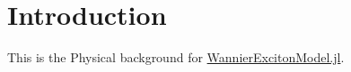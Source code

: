 \section{Introduction}

This is the Physical background for \href{https://github.com/MFC2001/WannierExcitonModel.jl}{WannierExcitonModel.jl}.